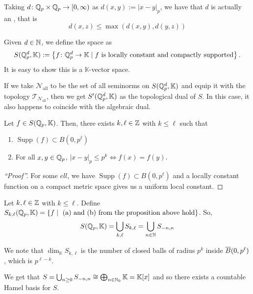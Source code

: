 \documentclass[11pt,leqno,oneside]{amsbook}
\numberwithin{thm}{section}
\newcommand{\Top}{\mathcal{T}} %
\newcommand{\cN}{\mathcal{N}}
\newcommand{\norms}{\cN}
\newcommand{\K}{\mathbb{K}} %
\newcommand{\supp}{\operatorname{Supp}}
\begin{document}
\begin{rmk}
  Taking \(d \colon {\mathbb Q}_p \times {\mathbb Q}_p \to [0,\infty)\) as \(d(x,y) :=
  |x-y|_p\), we have that \(d\) is actually an , that
  is \[
    d(x,z) \leq \max(d(x,y), d(y,z))
  \]
\end{rmk}
\begin{defn}
  Given \(d \in {\mathbb N}\), we define the  space as \[
    S(\Q_p^d,\K) := \left\{ f \from \Q_p^d \to \K \st f \text{ is
        locally constant and compactly supported} \right\}.
  \]
  It is easy to show this is a \(\K\)-vector space.
\end{defn}
\begin{example}
  If we take \(\norms_\text{all}\) to be the set of all seminorms on
  \(S(\Q_p^d,\K)\) and equip it with the topology
  \(\Top_{\norms_\text{all}}\), then we get \(S'(\Q_p^d,\K)\) as the
  topological dual of \(S\). In this case, it also happens to coincide
  with the algebraic dual.
\end{example}
\begin{prop}
  Let \(f \in S(\Q_p,\K)\). Then, there exists \(k,\ell \in {\mathbb Z}\) with
  \(k \leq \ell\) such that
  \begin{enumerate}
  \item \(\supp(f) \subset B(0,p^\ell)\)
  \item For all \(x,y \in {\mathbb Q}_p\), \(|x-y|_p \leq p^k \iff f(x) =
    f(y)\).
  \end{enumerate}
\end{prop}
\begin{proof}[``Proof'']
  For some \(ell\), we have \(\supp(f) \subset B(0,p^\ell)\) and a
  locally constant function on a compact metric space gives us a
  uniform local constant.
\end{proof}
\begin{defn}
  Let \(k,\ell \in {\mathbb Z}\) with \(k \leq \ell\). Define
  \(S_{k,\ell}(\Q_p,\K) = \{f \st \text{ (a) and (b) from the
    proposition above hold}\}\). So, \[
    S(\Q_p,\K) = \Union_{k,\ell} S_{k,\ell} = \Union_{n \in \N} S_{-n,n}
  \]
\end{defn}
We note that \(\dim_\K S_{k,\ell}\) is the number of closed balls of
radius \(p^k\) inside \(\overline{B}(0,p^\ell)\), which is \(p^{\ell-k}\).
\begin{rmk}
  We get that \(S = \Union_{n \geq 0} S_{-n,n} \isom \bigoplus_{n \in
    \N_0} \K = \K[x] \) and so there exists a countable Hamel basis
  for \(S\).
\end{rmk}
\end{document}
